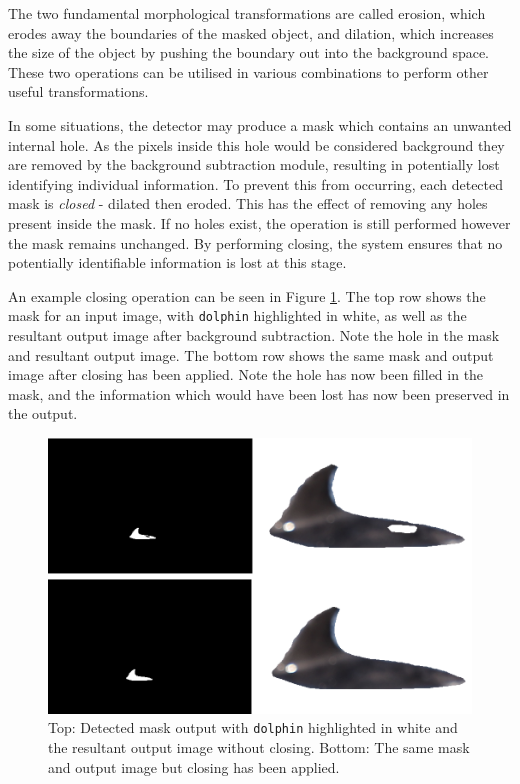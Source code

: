 The two fundamental morphological transformations are called erosion, which erodes away the boundaries of the masked object, and dilation, which increases the size of the object by pushing the boundary out into the background space. These two operations can be utilised in various combinations to perform other useful transformations.

In some situations, the detector may produce a mask which contains an unwanted internal hole. As the pixels inside this hole would be considered background they are removed by the background subtraction module, resulting in potentially lost identifying individual information. To prevent this from occurring, each detected mask is \textit{closed} - dilated then eroded. This has the effect of removing any holes present inside the mask. If no holes exist, the operation is still performed however the mask remains unchanged. By performing closing, the system ensures that no potentially identifiable information is lost at this stage. 

An example closing operation can be seen in Figure \ref{fig:before-and-after-morphing}. The top row shows the mask for an input image, with \texttt{dolphin} highlighted in white, as well as the resultant output image after background subtraction. Note the hole in the mask and resultant output image. The bottom row shows the same mask and output image after closing has been applied. Note the hole has now been filled in the mask, and the information which would have been lost has now been preserved in the output.

\begin{figure}[h]
	\begin{center}
		\includegraphics[scale=0.5]{Chapter4/figs/before-and-after-morphing-masks.png}
	\end{center}
	\caption{Top: Detected mask output with \texttt{dolphin} highlighted in white and the resultant output image without closing. Bottom: The same mask and output image but closing has been applied.}
	\label{fig:before-and-after-morphing}
\end{figure}





